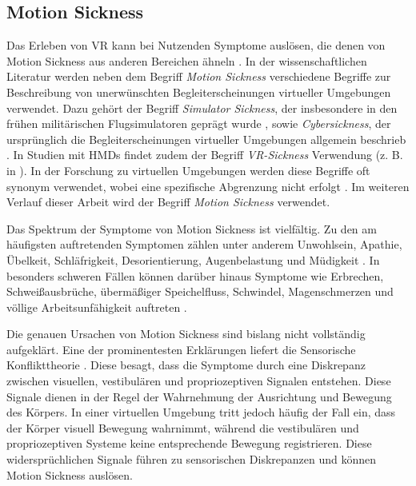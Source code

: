 \subsection{Motion Sickness}

Das Erleben von VR kann bei Nutzenden Symptome auslösen, die denen von Motion Sickness aus anderen Bereichen ähneln \citep{somrak_estimating_2019}. In der wissenschaftlichen Literatur werden neben dem Begriff \textit{Motion Sickness} verschiedene Begriffe zur Beschreibung von unerwünschten Begleiterscheinungen virtueller Umgebungen verwendet. Dazu gehört der Begriff \textit{Simulator Sickness}, der insbesondere in den frühen militärischen Flugsimulatoren geprägt wurde \citep{kennedy_simulator_1993}, sowie \textit{Cybersickness}, der ursprünglich die Begleiterscheinungen virtueller Umgebungen allgemein beschrieb \citep{10.5555/2870742.2870748}. In Studien mit HMDs findet zudem der Begriff \textit{VR-Sickness} Verwendung (z. B.  in \citep{kim_virtual_2018}). In der Forschung zu virtuellen Umgebungen werden diese Begriffe oft synonym verwendet, wobei eine spezifische Abgrenzung nicht erfolgt \citep{saredakis_factors_2020}. Im weiteren Verlauf dieser Arbeit wird der Begriff \textit{Motion Sickness} verwendet. 

Das Spektrum der Symptome von Motion Sickness ist vielfältig. Zu den am häufigsten auftretenden Symptomen zählen unter anderem Unwohlsein, Apathie, Übelkeit, Schläfrigkeit, Desorientierung, Augenbelastung und Müdigkeit \citep{somrak_estimating_2019}. In besonders schweren Fällen können darüber hinaus Symptome wie Erbrechen, Schweißausbrüche, übermäßiger Speichelfluss, Schwindel, Magenschmerzen und völlige Arbeitsunfähigkeit auftreten \citep{kennedy_research_2010}. 

Die genauen Ursachen von Motion Sickness sind bislang nicht vollständig aufgeklärt. Eine der prominentesten Erklärungen liefert die Sensorische Konflikttheorie \citep{oman_motion_1990}. Diese besagt, dass die Symptome durch eine Diskrepanz zwischen visuellen, vestibulären und propriozeptiven Signalen entstehen. Diese Signale dienen in der Regel der Wahrnehmung der Ausrichtung und Bewegung des Körpers. In einer virtuellen Umgebung tritt jedoch häufig der Fall ein, dass der Körper visuell Bewegung wahrnimmt, während die vestibulären und propriozeptiven Systeme keine entsprechende Bewegung registrieren. Diese widersprüchlichen Signale führen zu sensorischen Diskrepanzen und können Motion Sickness auslösen. 

